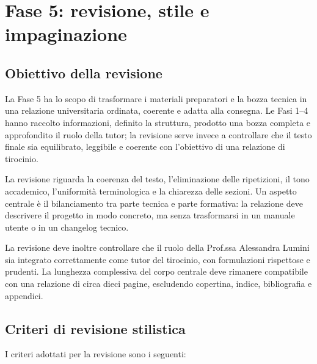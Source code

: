 
\chapter{Fase 5: revisione, stile e impaginazione}

\section{Obiettivo della revisione}

La Fase 5 ha lo scopo di trasformare i materiali preparatori e la bozza tecnica in una relazione universitaria ordinata, coerente e adatta alla consegna. Le Fasi 1--4 hanno raccolto informazioni, definito la struttura, prodotto una bozza completa e approfondito il ruolo della tutor; la revisione serve invece a controllare che il testo finale sia equilibrato, leggibile e coerente con l'obiettivo di una relazione di tirocinio.

La revisione riguarda la coerenza del testo, l'eliminazione delle ripetizioni, il tono accademico, l'uniformità terminologica e la chiarezza delle sezioni. Un aspetto centrale è il bilanciamento tra parte tecnica e parte formativa: la relazione deve descrivere il progetto \builder{} in modo concreto, ma senza trasformarsi in un manuale utente o in un changelog tecnico.

La revisione deve inoltre controllare che il ruolo della Prof.ssa Alessandra Lumini sia integrato correttamente come tutor del tirocinio, con formulazioni rispettose e prudenti. La lunghezza complessiva del corpo centrale deve rimanere compatibile con una relazione di circa dieci pagine, escludendo copertina, indice, bibliografia e appendici.

\section{Criteri di revisione stilistica}

I criteri adottati per la revisione sono i seguenti:

